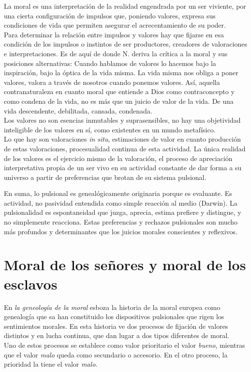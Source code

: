 \documentclass[a4paper, 10pt, twocolumn, spanish]{article}
\begin{document}
La moral es una interpretación de la realidad engendrada por un ser
viviente, por una cierta configuración de impulsos que, poniendo
valores, expresa sus condiciones de vida que permiten asegurar el
acrecentamiento de su poder.\\[0pt]
Para determinar la relación entre impulsos y valores hay que fijarse
en esa condición de los impulsos o instintos de ser productores,
creadores de valoraciones e interpretaciones. Es de aquí de donde
N. deriva la crítica a la moral y sus posiciones alternativas: Cuando
hablamos de valores lo hacemos bajo la inspiración, bajo la óptica de
la vida misma. La vida misma nos obliga a poner valores, valora a
través de nosotros cuando ponemos valores. Así, aquella
contranaturaleza en cuanto moral que entiende a Dios como
contraconcepto y como condena de la vida, no es más que un juicio de
valor de la vida. De una vida descendente, debilitada, cansada,
condenada.\\[0pt]

Los valores no son esencias inmutables y suprasensibles, no hay una
objetividad inteligible de los valores en sí, como existentes en un
mundo metafísico.\\[0pt]
Lo que hay son valoraciones \emph{in situ}, estimaciones de valor en cuanto
producción de estas valoraciones, procesualidad continua de esta
actividad. La única realidad de los valores es el ejercicio mismo de
la valoración, el proceso de apreciación interpretativa propia de un
ser vivo en su actividad constante de dar forma a su universo a partir
de preferencias que brotan de su sistema pulsional.

En suma, lo pulsional es genealógicamente originaria porque es
evaluante. Es actividad, no pasividad entendida como simple reacción
al medio (Darwin). La pulsionalidad es espontaneidad que juzga,
aprecia, estima prefiere y distingue, y no simplemente
reacciona. Estas preferencias y rechazos pulsionales son mucho más
profundos y determinantes que los juicios morales conscientes y
reflexivos.

\section{Moral de los señores y moral de los esclavos}
\label{sec:orgb1107ac}
En \emph{la geneología de la moral} esboza la historia de la moral europea
como genealogía que sa han constituido los dispositivos pulsionales
que rigen los sentimientos morales. En esta historia ve dos procesos
de fijación de valores distintos y en lucha continua, que dan lugar a
dos tipos diferentes de moral.\\[0pt]
Uno de estos procesos se establece como valor prioritario el valor
\emph{bueno}, mientras que el valor \emph{malo} queda como secundario o
accesorio. En el otro proceso, la prioridad la tiene el valor \emph{malo}.\\[0pt]
\end{document}
